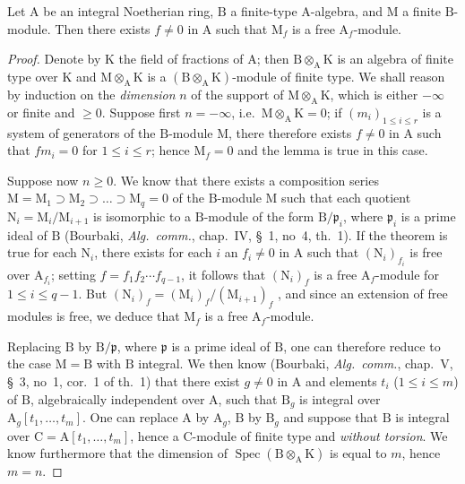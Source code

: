 \begin{lemma}[6.9.2]
\label{IV.6.9.2}
Let $\mathrm{A}$ be an integral Noetherian ring, $\mathrm{B}$ a finite-type $\mathrm{A}$-algebra, and $\mathrm{M}$ a finite $\mathrm{B}$-module. Then there exists $f\neq 0$ in $\mathrm{A}$ such that $\mathrm{M}_f$ is a free $\mathrm{A}_f$-module.
\end{lemma}

\begin{proof}
Denote by $\mathrm{K}$ the field of fractions of $\mathrm{A}$; then $\mathrm{B}\otimes_\mathrm{A}\mathrm{K}$ is an algebra of finite type over $\mathrm{K}$ and $\mathrm{M}\otimes_\mathrm{A}\mathrm{K}$ is a $(\mathrm{B}\otimes_\mathrm{A}\mathrm{K})$-module of finite type. We shall reason by induction on the \emph{dimension} $n$ of the support of $\mathrm{M}\otimes_\mathrm{A}\mathrm{K}$, which is either $-\infty$ or finite and $\geqslant 0$. Suppose first $n=-\infty$, i.e.\ $\mathrm{M}\otimes_\mathrm{A}\mathrm{K}=0$; if $(m_i)_{1\leqslant i\leqslant r}$ is a system of generators of the $\mathrm{B}$-module $\mathrm{M}$, there therefore exists $f\neq 0$ in $\mathrm{A}$ such that $fm_i=0$ for $1\leqslant i\leqslant r$; hence $\mathrm{M}_f=0$ and the lemma is true in this case.

Suppose now $n\geqslant 0$. We know that there exists a composition series $\mathrm{M}=\mathrm{M}_1\supset\mathrm{M}_2\supset\ldots\supset\mathrm{M}_q=0$ of the $\mathrm{B}$-module $\mathrm{M}$ such that each quotient $\mathrm{N}_i=\mathrm{M}_i/\mathrm{M}_{i+1}$ is isomorphic to a $\mathrm{B}$-module of the form $\mathrm{B}/\mathfrak{p}_i$, where $\mathfrak{p}_i$ is a prime ideal of $\mathrm{B}$ (Bourbaki, \emph{Alg.\ comm.}, chap.~IV, \S~1, no~4, th.~1). If the theorem is true for each $\mathrm{N}_i$, there exists for each $i$ an $f_i\neq 0$ in $\mathrm{A}$ such that $(\mathrm{N}_i)_{f_i}$ is free over $\mathrm{A}_{f_i}$; setting $f=f_1f_2\cdots f_{q-1}$, it follows that $(\mathrm{N}_i)_f$ is a free $\mathrm{A}_f$-module for $1\leqslant i\leqslant q-1$. But $(\mathrm{N}_i)_f=(\mathrm{M}_i)_f/(\mathrm{M}_{i+1})_f$ , and since an extension of free modules is free, we deduce that $\mathrm{M}_f$ is a free $\mathrm{A}_f$-module.

Replacing $\mathrm{B}$ by $\mathrm{B}/\mathfrak{p}$, where $\mathfrak{p}$ is a prime ideal of $\mathrm{B}$, one can therefore reduce to the case $\mathrm{M}=\mathrm{B}$ with $\mathrm{B}$ integral. We then know (Bourbaki, \emph{Alg.\ comm.}, chap.~V, \S~3, no~1, cor.~1 of th.~1) that there exist $g\neq 0$ in $\mathrm{A}$ and elements $t_i$ ($1\leqslant i\leqslant m$) of $\mathrm{B}$, algebraically independent over $\mathrm{A}$, such that $\mathrm{B}_g$ is integral over $\mathrm{A}_g[t_1,\ldots,t_m]$. One can replace $\mathrm{A}$ by $\mathrm{A}_g$, $\mathrm{B}$ by $\mathrm{B}_g$ and suppose that $\mathrm{B}$ is integral over $\mathrm{C}=\mathrm{A}[t_1,\ldots,t_m]$, hence a $\mathrm{C}$-module of finite type and \emph{without torsion}. We know furthermore  that the dimension of $\operatorname{Spec}(\mathrm{B}\otimes_\mathrm{A}\mathrm{K})$ is equal to $m$, hence $m=n$.


\end{proof}
